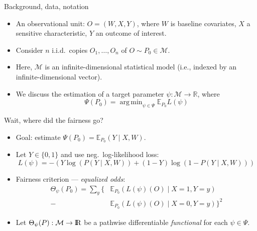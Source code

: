 \documentclass[12pt,t,handout]{beamer}
\newcommand{\E}{\mathbb{E}}
\DeclareMathOperator*{\argmin}{arg\,min}
\newcommand{\openr}{\hbox{${\rm I\kern-.2em R}$}}
\begin{document}

\begin{frame}[c]{Background, data, notation}

\begin{center}
\begin{itemize}
  \itemsep12pt
  \item An observational unit: $O = (W, X, Y)$, where $W$ is baseline
    covariates, $X$ a sensitive characteristic, $Y$ an outcome of interest.
  \item Consider $n$ i.i.d.~copies $O_1, \ldots, O_n$ of $O \sim P_0 \in
    \mathcal{M}$.
  \item Here, $\mathcal{M}$ is an infinite-dimensional statistical model (i.e.,
    indexed by an infinite-dimensional vector).
  \item We discuss the estimation of a target parameter $\psi : \mathcal{M}
    \rightarrow \mathbb{R}$, where
    $$\Psi(P_0) = \argmin_{\psi \in \Psi} \E_{P_0}L(\psi)$$
\end{itemize}
\end{center}


\end{frame}


\begin{frame}[c]{Wait, where did the fairness go?}

\begin{center}
\begin{itemize}
  \itemsep12pt
  \item Goal: estimate $\Psi(P_0) = \E_{P_0}(Y \mid X, W)$.
  \item Let $Y \in \{0, 1\}$ and use neg.~log-likelihood loss:
    $$L(\psi) = -(Y \log(P(Y \mid X, W)) + (1 - Y) \log(1 - P(Y \mid X, W)))$$
  \item Fairness criterion --- \textit{equalized odds}:
    $$\begin{aligned}
      \Theta_{\psi}(P_0) = \sum_y \{&\E_{P_0}(L(\psi)(O) \mid X = 1, Y = y) \\ -
      &\E_{P_0}(L(\psi)(O) \mid X = 0, Y = y)\}^2
    \end{aligned}$$
  \item Let $\Theta_{\psi}(P): \mathcal{M} \rightarrow \openr$ be a pathwise
    differentiable \textit{functional} for each $\psi \in \Psi$.
\end{itemize}
\end{center}

\note{
}

\end{frame}
\end{document}
